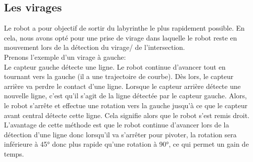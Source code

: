         \subsection{Les virages}
                Le robot a pour objectif de sortir du labyrinthe le plus rapidement possible. En cela, nous avons opté pour une prise de virage dans laquelle le robot reste en mouvement lors de la détection du virage/ de l'intersection. \\ Prenons l'exemple d'un virage à gauche: \\ 
                Le capteur gauche détecte une ligne. Le robot continue d'avancer tout en tournant vers la gauche (il a une trajectoire de courbe). Dès lors, le capteur arrière va perdre le contact d'une ligne. Lorsque le capteur arrière détecte une nouvelle ligne, c'est qu'il s'agit de la ligne détectée par le capteur gauche. Alors, le robot s'arrête et effectue une rotation vers la gauche jusqu'à ce que le capteur avant central détecte cette ligne. Cela signifie alors que le robot s'est remis droit. \\ L'avantage de cette méthode est que le robot continue d'avancer lors de la détection d'une ligne donc lorsqu'il va s'arrêter pour pivoter, la rotation sera inférieure à 45° donc plus rapide qu'une rotation à 90°, ce qui permet un gain de temps. \\ 


